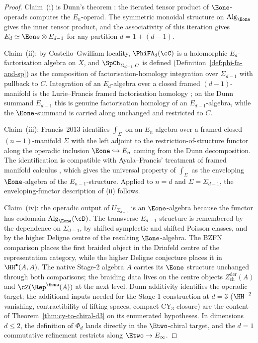 \begin{proof}
Claim~\textup{(i)} is Dunn's theorem \textup{\cite[\S 5.1.2]{LurieHA}}: the iterated tensor product of $\Eone$-operads computes the $E_n$-operad. The symmetric monoidal structure on $\mathrm{Alg}_{\Eone}$ gives the inner tensor product, and the associativity of this iteration gives $E_d \simeq \Eone \otimes E_{d-1}$ for any partition $d = 1 + (d-1)$.

Claim~\textup{(ii)}: by Costello--Gwilliam locality, $\PhiFA_d(\cC)$ is a holomorphic $E_d$-factorisation algebra on $X$, and $\SpCh_{\Sigma_{d-1}, C}$ is defined (Definition~\ref{def:phi-fa-and-sp}) as the composition of factorisation-homology integration over $\Sigma_{d-1}$ with pullback to $C$. Integration of an $E_d$-algebra over a closed framed $(d{-}1)$-manifold is the Lurie--Francis framed factorisation homology \textup{\cite[\S 5.5]{LurieHA}}; on the Dunn summand $E_{d-1}$ this is genuine factorisation homology of an $E_{d-1}$-algebra, while the $\Eone$-summand is carried along unchanged and restricted to $C$.

Claim~\textup{(iii)}: Francis~$2013$ \textup{\cite[Thm.~$4.1$]{Francis2013}} identifies $\int_{\Sigma}$ on an $E_n$-algebra over a framed closed $(n{-}1)$-manifold $\Sigma$ with the left adjoint to the restriction-of-structure functor along the operadic inclusion $\Eone \hookrightarrow E_n$ coming from the Dunn decomposition. The identification is compatible with Ayala--Francis' treatment of framed manifold calculus \textup{\cite{AyalaFrancis2015, AyalaFrancis2015b}}, which gives the universal property of $\int_{\Sigma}$ as the enveloping $\Eone$-algebra of the $E_{n-1}$-structure. Applied to $n = d$ and $\Sigma = \Sigma_{d-1}$, the enveloping-functor description of (ii) follows.

Claim~\textup{(iv)}: the operadic output of \(U_{\Sigma_{d-1}}\) is an
\(\Eone\)-algebra because the functor has codomain
\(\mathrm{Alg}_{\Eone}(\cD)\).  The transverse \(E_{d-1}\)-structure is
remembered by the dependence on \(\Sigma_{d-1}\), by shifted
symplectic and shifted Poisson classes, and by the higher Deligne
centre of the resulting \(\Eone\)-algebra.  The BZFN comparison places
the first braided object in the Drinfeld centre of the representation
category, while the higher Deligne conjecture places it in
\(\HH^\bullet(A,A)\).  The native Stage-2 algebra \(A\) carries its
\(\Eone\) structure unchanged through both comparisons; the braiding
data lives on the centre objects $Z^{\mathrm{der}}_{\mathrm{ch}}(A)$
and $\cZ(\Rep^{\Eone}(A))$ at the next level.  Dunn additivity
identifies the operadic target; the additional inputs needed for the
Stage-1 construction at $d=3$ (\(\HH^{-2}\)-vanishing, contractibility of
lifting spaces, compact CY$_3$ closure) are the content of
Theorem~\ref{thm:cy-to-chiral-d3} on its enumerated hypotheses.  In dimensions \(d\leq2\), the definition of
\(\Phi_d\) lands directly in the \(\Etwo\)-chiral target, and the
\(d=1\) commutative refinement restricts along \(\Etwo\to E_\infty\).
\end{proof}

